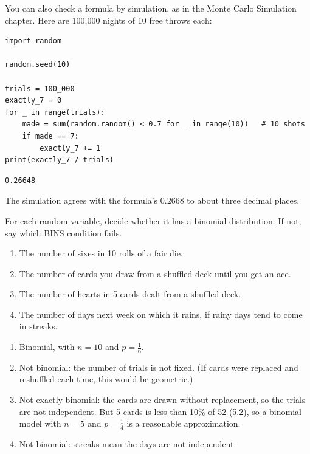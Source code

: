 You can also check a formula by simulation, as in the Monte Carlo Simulation chapter.
Here are 100,000 nights of 10 free throws each:
\begin{verbatim}
import random

random.seed(10)

trials = 100_000
exactly_7 = 0
for _ in range(trials):
    made = sum(random.random() < 0.7 for _ in range(10))   # 10 shots
    if made == 7:
        exactly_7 += 1
print(exactly_7 / trials)
\end{verbatim}
\begin{verbatim}
0.26648
\end{verbatim}
The simulation agrees with the formula's $0.2668$ to about three decimal places.

\begin{Exercise}[title={Is It Binomial?}, label=bg_bins]
For each random variable, decide whether it has a binomial distribution. If not, say
which BINS condition fails.
\begin{enumerate}
\item The number of sixes in 10 rolls of a fair die.
\item The number of cards you draw from a shuffled deck until you get an ace.
\item The number of hearts in 5 cards dealt from a shuffled deck.
\item The number of days next week on which it rains, if rainy days tend to come in streaks.
\end{enumerate}
\end{Exercise}
\begin{Answer}[ref=bg_bins]
\begin{enumerate}
\item Binomial, with $n = 10$ and $p = \frac{1}{6}$.
\item Not binomial: the number of trials is not fixed. (If cards were replaced and
reshuffled each time, this would be geometric.)
\item Not exactly binomial: the cards are drawn without replacement, so the trials are
not independent. But 5 cards is less than 10\% of 52 (5.2), so a binomial model with
$n = 5$ and $p = \frac{1}{4}$ is a reasonable approximation.
\item Not binomial: streaks mean the days are not independent.
\end{enumerate}
\end{Answer}

